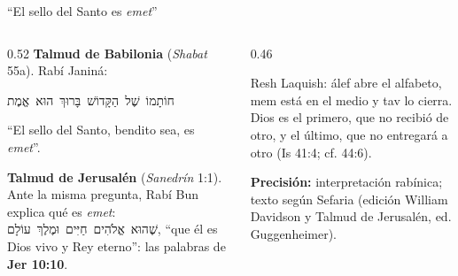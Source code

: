 \documentclass[hyperref={bookmarks=false},aspectratio=169]{beamer}
\newcommand{\heb}[1]{\mbox{\foreignlanguage{hebrew}{#1}}}
\newcommand{\destacar}[1]{\textbf{\textcolor{azul}{#1}}}
\newcommand{\precision}[1]{{\footnotesize\color{gris}\textbf{Precisión:} #1}}
\begin{document}
\begin{frame}{``El sello del Santo es \emph{emet}''}
\begin{columns}[t,onlytextwidth]
\begin{column}{0.52\textwidth}\small
\textbf{Talmud de Babilonia} (\emph{Shabat} 55a). Rabí Janiná:
\begin{center}\heb{חוֹתָמוֹ שֶׁל הַקָּדוֹשׁ בָּרוּךְ הוּא אֱמֶת}\end{center}
``El sello del Santo, bendito sea, es \emph{emet}''.\par\medskip
\textbf{Talmud de Jerusalén} (\emph{Sanedrín} 1:1). Ante la misma pregunta, Rabí Bun explica qué es \emph{emet}: \heb{שֶׁהוּא אֱלֹהִים חַיִּים וּמֶלֶךְ עוֹלָם}, ``que él es Dios vivo y Rey eterno'': las palabras de \destacar{Jer 10:10}.
\end{column}
\begin{column}{0.46\textwidth}
\centering
{}\par\smallskip
\scriptsize Resh Laquish: álef abre el alfabeto, mem está en el medio y tav lo cierra. Dios es el primero, que no recibió de otro, y el último, que no entregará a otro (Is 41:4; cf. 44:6).\par\smallskip
\precision{interpretación rabínica; texto según Sefaria (edición William Davidson y Talmud de Jerusalén, ed. Guggenheimer).}
\end{column}
\end{columns}
\end{frame}
\end{document}
